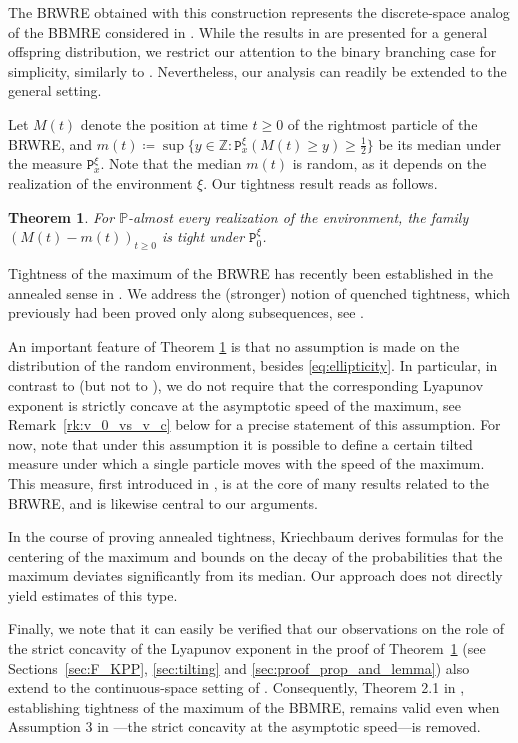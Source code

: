 \documentclass[12pt,reqno,oneside]{amsart}
\numberwithin{equation}{section}
\newtheorem{theorem}{Theorem}[section]
\theoremstyle{definition}
\theoremstyle{remark}
\newcommand{\Z}{\mathbb{Z}}
\begin{document}
The BRWRE obtained with this construction represents the discrete-space
analog of the BBMRE considered in \cite{CDO25}. While the results in
\cite{CDO25} are presented for a general offspring distribution, we restrict
our attention to the binary branching case for simplicity, similarly to
\cite{CD20}. Nevertheless, our analysis can readily be extended to the
general setting.

Let $M(t)$ denote the position at time $t \geq 0$ of the rightmost particle
of the BRWRE, and
$m(t)\coloneq \sup\{y \in \Z: \mathtt{P}_x^\xi(M(t)\geq y) \geq
  \frac{1}{2}\}$
be its median under the measure $\mathtt{P}_x^\xi$. Note
that the median $m(t)$ is random, as it depends on the realization of the
environment $\xi$. Our tightness result reads as follows.

\begin{theorem}\label{thm:tightness}
    For $\mathbb P$-almost every realization of the environment, the family
    $(M(t)- m(t) )_{t \geq 0}$ is tight under $\mathtt{P}_0^\xi$.
\end{theorem}

Tightness of the maximum of the BRWRE has recently been established in the
annealed sense in \cite{Kri24}. We address the (stronger) notion of quenched
tightness, which previously had been proved only along subsequences, see
\cite{Kri21}.


An important feature of Theorem \ref{thm:tightness} is that no assumption is
made on the distribution of the random environment, besides
\eqref{eq:ellipticity}. In particular, in contrast to \cite{Kri24, CDO25}
(but not to \cite{Kri21}), we do not require that the corresponding Lyapunov
exponent is strictly concave at the asymptotic speed of the maximum, see
Remark~\ref{rk:v_0_vs_v_c} below for a precise statement of this assumption.
For now, note that under this assumption it is possible to define a certain
tilted measure under which a single particle moves with the speed of the
maximum. This measure, first introduced in \cite{CD20}, is at the core of
many results related to the BRWRE, and is likewise central to our arguments.

In the course of proving annealed tightness, Kriechbaum \cite{Kri24} derives
formulas for the centering of the maximum and bounds on the decay of the
probabilities that the maximum deviates significantly from its median. Our
approach does not directly yield estimates of this type.

Finally, we note that it can easily be verified that our observations on the
role of the strict concavity of the Lyapunov exponent in the proof of
Theorem~\ref{thm:tightness} (see Sections~\ref{sec:F_KPP}, \ref{sec:tilting}
  and \ref{sec:proof_prop_and_lemma}) also extend to the continuous-space
setting of \cite{CDO25}. Consequently, Theorem 2.1 in
  \cite{CDO25}, establishing tightness of the maximum of the BBMRE, remains
  valid even when Assumption 3 in \cite{CDO25}---the strict concavity at the
  asymptotic speed---is removed.
\end{document}
